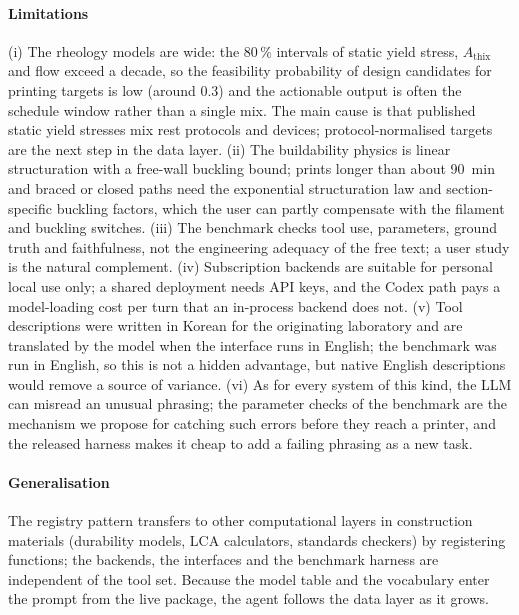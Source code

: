 \documentclass[preprint,12pt]{elsarticle}
\begin{document}
\paragraph{Limitations} (i) The rheology models are wide: the 80\,\% intervals of static yield stress, $A_{\mathrm{thix}}$ and flow exceed a decade, so the feasibility probability of design candidates for printing targets is low (around 0.3) and the actionable output is often the schedule window rather than a single mix. The main cause is that published static yield stresses mix rest protocols and devices; protocol-normalised targets are the next step in the data layer. (ii) The buildability physics is linear structuration with a free-wall buckling bound; prints longer than about 90~min and braced or closed paths need the exponential structuration law and section-specific buckling factors, which the user can partly compensate with the filament and buckling switches. (iii) The benchmark checks tool use, parameters, ground truth and faithfulness, not the engineering adequacy of the free text; a user study is the natural complement. (iv) Subscription backends are suitable for personal local use only; a shared deployment needs API keys, and the Codex path pays a model-loading cost per turn that an in-process backend does not. (v) Tool descriptions were written in Korean for the originating laboratory and are translated by the model when the interface runs in English; the benchmark was run in English, so this is not a hidden advantage, but native English descriptions would remove a source of variance. (vi) As for every system of this kind, the LLM can misread an unusual phrasing; the parameter checks of the benchmark are the mechanism we propose for catching such errors before they reach a printer, and the released harness makes it cheap to add a failing phrasing as a new task.

\paragraph{Generalisation} The registry pattern transfers to other computational layers in construction materials (durability models, LCA calculators, standards checkers) by registering functions; the backends, the interfaces and the benchmark harness are independent of the tool set. Because the model table and the vocabulary enter the prompt from the live package, the agent follows the data layer as it grows.

\end{document}
